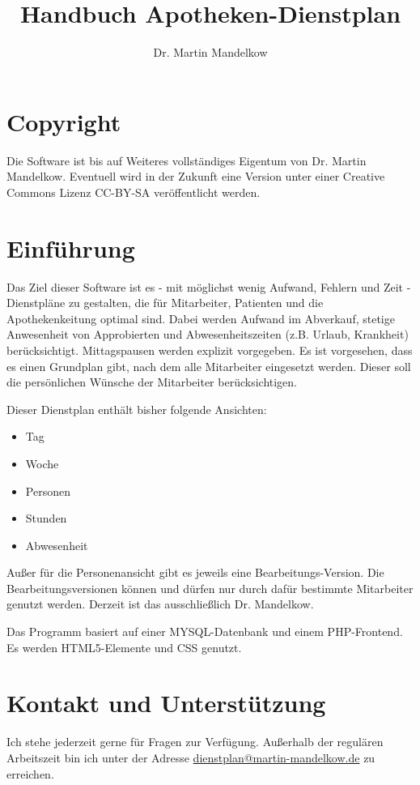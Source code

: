 \documentclass[10pt,a4paper,titlepage,oneside]{article}
\author{Dr. Martin Mandelkow}
\title{Handbuch Apotheken-Dienstplan}
\begin{document}
\maketitle
\tableofcontents\pagebreak 
\section{Copyright}
Die Software ist bis auf Weiteres vollständiges Eigentum von Dr. Martin Mandelkow.
Eventuell wird in der Zukunft eine Version unter einer Creative Commons Lizenz CC-BY-SA veröffentlicht werden.
\section{Einführung}
Das Ziel dieser Software ist es - mit möglichst wenig Aufwand, Fehlern und Zeit - Dienstpläne zu gestalten, die für Mitarbeiter, Patienten und die Apothekenkeitung optimal sind.
Dabei werden Aufwand im Abverkauf, stetige Anwesenheit von Approbierten und Abwesenheitszeiten (z.B. Urlaub, Krankheit) berücksichtigt. Mittagspausen werden explizit vorgegeben.
Es ist vorgesehen, dass es einen Grundplan gibt, nach dem alle Mitarbeiter eingesetzt werden. Dieser soll die persönlichen Wünsche der Mitarbeiter berücksichtigen.

Dieser Dienstplan enthält bisher folgende Ansichten:
\begin{itemize}
	\item Tag
	\item Woche
	\item Personen
	\item Stunden
	\item Abwesenheit
\end{itemize}

Außer für die Personenansicht gibt es jeweils eine Bearbeitungs-Version.
Die Bearbeitungsversionen können und dürfen nur durch dafür bestimmte Mitarbeiter genutzt werden. Derzeit ist das ausschließlich Dr. Mandelkow.

Das Programm basiert auf einer MYSQL-Datenbank und einem PHP-Frontend.
Es werden HTML5-Elemente und CSS genutzt.


\section{Kontakt und Unterstützung}
Ich stehe jederzeit gerne für Fragen zur Verfügung.
Außerhalb der regulären Arbeitszeit bin ich unter der Adresse \href{mailto:dienstplan@martin-mandelkow.de}{dienstplan@martin-mandelkow.de} zu erreichen.
\end{document}
